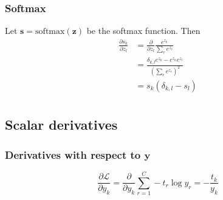 \documentclass{article}
\begin{document}
\subsubsection*{Softmax}

Let $\mathbf{s} = \textrm{softmax}(\mathbf{z})$ be the softmax function. Then
\begin{equation}
\begin{split}
    \frac{\partial s_k}{\partial z_l}
    &= \frac{\partial}{\partial z_l} \frac{e^{z_k}}{\sum_r e^{z_r}} \\
    &= \frac{\delta_{k,l} e^{z_k} - e^{z_k}e^{z_l}}
            {\left(\sum_r e^{z_r}\right)^2} \\
    &=  s_k (\delta_{k,l} - s_l) \\
\end{split}
\end{equation}

\subsection*{Scalar derivatives}

\subsubsection*{Derivatives with respect to $\mathbf{y}$}
\begin{equation}
    \frac{\partial \mathcal{L}}{\partial y_k}
    = \frac{\partial}{\partial y_k} \sum_{r=1}^C - t_r \log y_r
    = -\frac{t_k}{y_k}
\end{equation}
\end{document}
